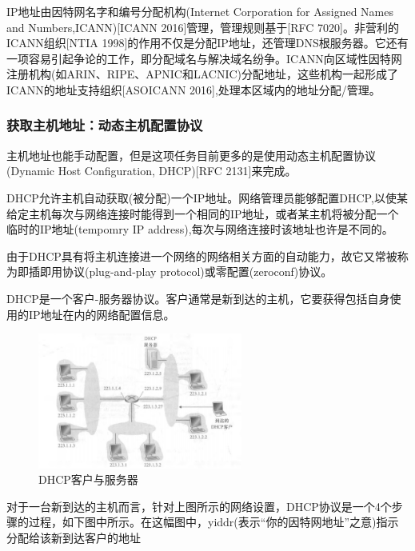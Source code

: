     IP地址由因特网名字和编号分配机构(Internet Corporation for Assigned Names and Numbers,ICANN)[ICANN 2016]管理，管理规则基于[RFC 7020]。非营利的ICANN组织[NTIA 1998]的作用不仅是分配IP地址，还管理DNS根服务器。它还有一项容易引起争论的工作，即分配域名与解决域名纷争。ICANN向区域性因特网注册机构(如ARIN、RIPE、APNIC和LACNIC)分配地址，这些机构一起形成了ICANN的地址支持组织[ASOICANN 2016],处理本区域内的地址分配/管理。

\subsubsection{获取主机地址：动态主机配置协议}

    主机地址也能手动配置，但是这项任务目前更多的是使用动态主机配置协议(Dynamic Host Configuration, DHCP)[RFC 2131]来完成。

    DHCP允许主机自动获取(被分配)一个IP地址。网络管理员能够配置DHCP,以使某给定主机每次与网络连接时能得到一个相同的IP地址，或者某主机将被分配一个临时的IP地址(tempomry IP address),每次与网络连接时该地址也许是不同的。

    由于DHCP具有将主机连接进一个网络的网络相关方面的自动能力，故它又常被称为即插即用协议(plug-and-play protocol)或零配置(zeroconf)协议。

    DHCP是一个客户-服务器协议。客户通常是新到达的主机，它要获得包括自身使用的IP地址在内的网络配置信息。

\begin{figure}[!htbp]
    \centering
    \includegraphics[width=0.6\textwidth]{image/chapter04/DHCP服务器.png}
    \caption{DHCP客户与服务器}
\end{figure}

    对于一台新到达的主机而言，针对上图所示的网络设置，DHCP协议是一个4个步骤的过程，如下图中所示。在这幅图中，yiddr(表示“你的因特网地址”之意)指示分配给该新到达客户的地址

